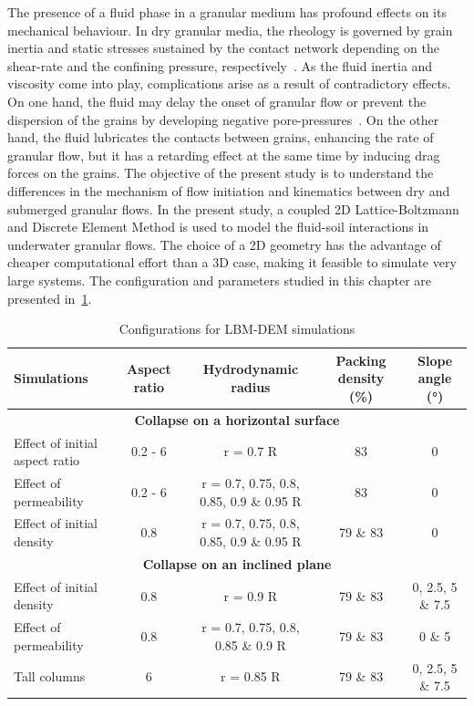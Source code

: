 The presence of a fluid phase in a granular medium has profound effects on its 
mechanical behaviour. In dry granular media, the rheology is governed by grain 
inertia and static stresses sustained by the contact network depending on the 
shear-rate and the confining pressure, respectively~\citep{Midi2004}. As the 
fluid inertia and viscosity come into play, complications arise as a result of 
contradictory effects. On one hand, the fluid may delay the onset of
granular flow or prevent the dispersion of the grains by
developing negative pore-pressures~\citep{Pailha2008,Topin2011}. On the other
hand, the fluid lubricates the contacts between grains, enhancing the rate of 
granular flow, but it has a retarding effect at the same time by 
inducing drag forces on the grains. The objective of the present study is to 
understand 
the differences in the mechanism of flow initiation and kinematics between dry 
and submerged granular flows. In the present study, a coupled 2D 
Lattice-Boltzmann and Discrete Element Method is used to model the fluid-soil 
interactions in  underwater granular flows.  The choice of a 2D geometry has 
the advantage of cheaper computational effort than a 3D case, making it 
feasible to simulate very large systems. The configuration and parameters 
studied in this chapter are presented in~\cref{table:lbm-dem-setup}.

\begin{landscape}[tbph]
\centering
\begin{table}[tbph]
\centering
\caption{Configurations for LBM-DEM simulations}
\label{table:lbm-dem-setup}
\begin{tabular}{lcccc}
\toprule
\textbf{Simulations} & \textbf{Aspect ratio} & \textbf{Hydrodynamic radius} & 
\textbf{Packing density (\%)} & \textbf{Slope angle (\si{\degree})}\\ \midrule
\multicolumn{5}{c}{\textbf{Collapse on a horizontal surface}} \\
Effect of initial aspect ratio & 0.2 - 6 & r = 0.7 R &  83 & 0 \\
Effect of permeability & 0.2 - 6 & r = 0.7, 0.75, 0.8, 0.85, 0.9 \& 0.95 R &  
83 & 0 \\
Effect of initial density & 0.8 & r = 0.7, 0.75, 0.8, 0.85, 0.9 \& 0.95 R 
& 79 \& 83 & 0 \\ \midrule
\multicolumn{5}{c}{\textbf{Collapse on an inclined plane}} \\
Effect of initial density & 0.8 & r = 0.9 R & 79 \& 83 & 0, 2.5, 5 \& 7.5 
\\
Effect of permeability & 0.8 & r = 0.7, 0.75, 0.8, 0.85 \& 0.9 R &  79 \& 
83 & 0 \& 5 \\ \midrule
Tall columns & 6 & r = 0.85 R & 79 \& 83 & 0, 2.5, 5 \& 7.5 \\
\bottomrule
\end{tabular}
\end{table}
\end{landscape}


